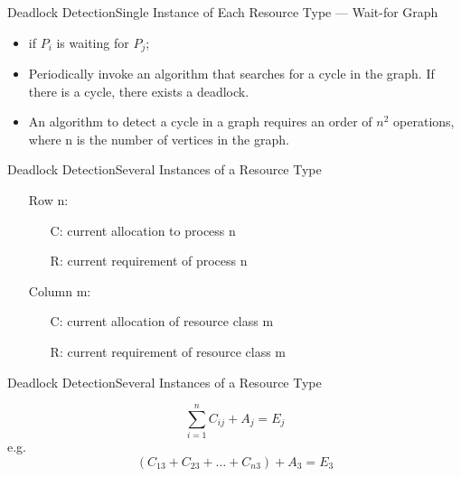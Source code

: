 \begin{frame}{Deadlock Detection}{Single Instance of Each Resource Type --- Wait-for
    Graph}
  \begin{center}
  \end{center}
  \begin{itemize}
  \item {} if $P_i$ is waiting for $P_j$;
  \item Periodically invoke an algorithm that searches for a cycle in the graph. If there
    is a cycle, there exists a deadlock.
  \item An algorithm to detect a cycle in a graph requires an order of $n^2$ operations,
    where n is the number of vertices in the graph.
  \end{itemize}
\end{frame}

\begin{frame}{Deadlock Detection}{Several Instances of a Resource Type}
  \begin{center}
  \end{center}
  \begin{itemize}
  \item[] Row n:
    \begin{itemize}
    \item[C:] current allocation to process n
    \item[R:] current requirement of process n
    \end{itemize}
  \item[] Column m:
    \begin{itemize}
    \item[C:] current allocation of resource class m
    \item[R:] current requirement of resource class m
    \end{itemize}
  \end{itemize}
\end{frame}

\begin{frame}{Deadlock Detection}{Several Instances of a Resource Type}
  \begin{center}
     
  \end{center}
  \begin{displaymath}
    \sum_{i=1}^nC_{ij}+A_j=E_j
  \end{displaymath}
  e.g.
  \begin{displaymath}
    (C_{13}+C_{23}+\ldots{}+C_{n3})+A_3=E_3
  \end{displaymath}
\end{frame}


